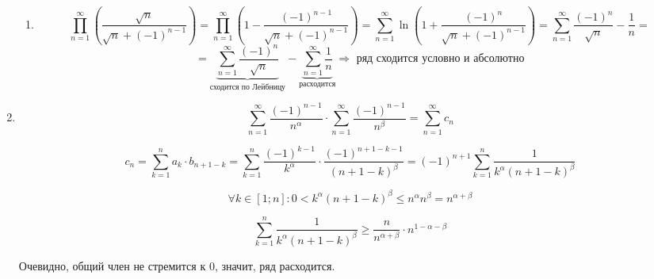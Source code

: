 \documentclass[11pt]{article}
\begin{document}
\begin{enumerate}
\begin{enumerate}
		\item    
		
		$$\prod_{n=1}^{\infty} \left(
		\frac{\sqrt{n}}{\sqrt{n} + (-1)^{n-1}} \right) = \prod_{n=1}^{\infty} \left( 1 - 
		\frac{(-1)^{n-1}}{\sqrt{n} + (-1)^{n-1}} \right) = \sum_{n=1}^{\infty} \operatorname{ln} \left( 1 + 
		\frac{(-1)^{n}}{\sqrt{n} + (-1)^{n-1}} \right) = \sum_{n=1}^{\infty} \frac{(-1)^n}{\sqrt{n}} - \frac{1}{n} = $$ $$= \underbrace{\sum_{n=1}^{\infty} \frac{(-1)^n}{\sqrt{n}}}_{\text{сходится по Лейбницу}} -\underbrace{\sum_{n=1}^{\infty} \frac{1}{n}}_{\text{расходится}} \Rightarrow \text{ ряд сходится условно и абсолютно}$$
	\end{enumerate}
	\item  $$\sum_{n=1}^{\infty}\frac{(-1)^{n-1}}{n^{\alpha}} \cdot \sum_{n=1}^{\infty}\frac{(-1)^{n-1}}{n^{\beta}} =\sum_{n=1}^{\infty} c_n $$

	$$c_n = \sum_{k=1}^{n} a_k \cdot b_{n+1-k} = \sum_{k=1}^{n} \frac{(-1)^{k-1}}{k^{\alpha}} \cdot \frac{(-1)^{n+1 - k-1}}{(n+1-k)^{\beta}} = (-1)^{n+1} \sum_{k=1}^{n} \frac{1}{k^{\alpha}(n+1-k)^{\beta}}$$

	$$\forall k \in [1;n] : 0 < k^{\alpha}(n+1-k)^{\beta} \leq n^{\alpha} n^{\beta} =  n^{\alpha + \beta}$$

	$$\sum_{k=1}^{n} \frac{1}{k^{\alpha}(n+1-k)^{\beta}} \geq \frac{n}{n^{\alpha + \beta}} \cdot n^{1- \alpha - \beta}$$

Очевидно, общий член не стремится к 0, значит, ряд расходится.
		
	\end{enumerate}
\end{document}
